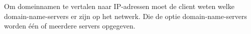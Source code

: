 Om domeinnamen te vertalen naar IP-adressen moet de client weten welke domain-name-servers er zijn op het netwerk. Die de optie domain-name-servers worden \'e\'en of meerdere servers opgegeven.

